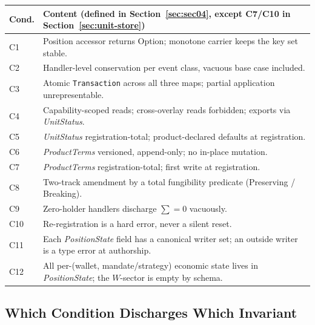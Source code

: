 \begin{center}
\small
\begin{longtable}{@{}p{1cm}p{10.4cm}@{}}
\toprule
\textbf{Cond.} & \textbf{Content (defined in Section~\ref{sec:sec04}, except C7/C10 in Section~\ref{sec:unit-store})} \\
\midrule
\endhead
C1 & Position accessor returns Option; monotone carrier keeps the key set stable. \\
C2 & Handler-level conservation per event class, vacuous base case included. \\
C3 & Atomic \texttt{Transaction} across all three maps; partial application unrepresentable. \\
C4 & Capability-scoped reads; cross-overlay reads forbidden; exports via \emph{UnitStatus}. \\
C5 & \emph{UnitStatus} registration-total; product-declared defaults at registration. \\
C6 & \emph{ProductTerms} versioned, append-only; no in-place mutation. \\
C7 & \emph{ProductTerms} registration-total; first write at registration. \\
C8 & Two-track amendment by a total fungibility predicate (Preserving / Breaking). \\
C9 & Zero-holder handlers discharge $\sum=0$ vacuously. \\
C10 & Re-registration is a hard error, never a silent reset. \\
C11 & Each \emph{PositionState} field has a canonical writer set; an outside writer is a type error at authorship. \\
C12 & All per-(wallet, mandate/strategy) economic state lives in \emph{PositionState}; the $W$-sector is empty by schema. \\
\bottomrule
\end{longtable}
\end{center}

\subsection{Which Condition Discharges Which Invariant}
\label{sec:sec15-discharge}


